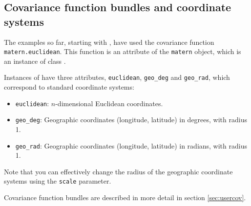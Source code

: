 \documentclass{manual}
\begin{document}
\subsection{Covariance function bundles and coordinate systems}
The examples so far, starting with , have used the covariance function \texttt{matern.euclidean}. This function is an attribute of the \texttt{matern} object, which is an instance of class .

Instances of  have three attributes, \texttt{euclidean}, \texttt{geo_deg} and \texttt{geo_rad}, which correspond to standard coordinate systems:
\begin{itemize}
    \item \texttt{euclidean}: $n$-dimensional Euclidean coordinates.
    \item \texttt{geo_deg}: Geographic coordinates (longitude, latitude) in degrees, with radius 1.
    \item \texttt{geo_rad}: Geographic coordinates (longitude, latitude) in radians, with radius 1.
\end{itemize}
Note that you can effectively change the radius of the geographic coordinate systems using the \texttt{scale} parameter.

Covariance function bundles are described in more detail in section \ref{sec:usercov}.
 
\end{document}
